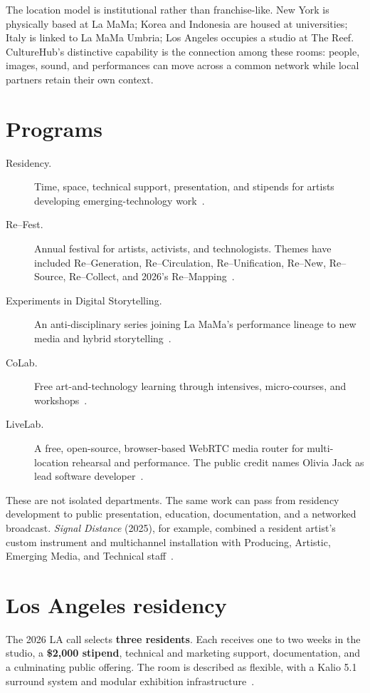 \documentclass[10pt,letterpaper,twocolumn]{article}
\begin{document}
The location model is institutional rather than franchise-like. New York is physically based at La MaMa; Korea and Indonesia are housed at universities; Italy is linked to La MaMa Umbria; Los Angeles occupies a studio at The Reef. CultureHub's distinctive capability is the connection among these rooms: people, images, sound, and performances can move across a common network while local partners retain their own context.

\section{Programs}

\begin{description}
\item[Residency.] Time, space, technical support, presentation, and stipends for artists developing emerging-technology work~\citep{chresidency}.
\item[Re--Fest.] Annual festival for artists, activists, and technologists. Themes have included Re--Generation, Re--Circulation, Re--Unification, Re--New, Re--Source, Re--Collect, and 2026's Re--Mapping~\citep{chrefest}.
\item[Experiments in Digital Storytelling.] An anti-disciplinary series joining La MaMa's performance lineage to new media and hybrid storytelling~\citep{cheds}.
\item[CoLab.] Free art-and-technology learning through intensives, micro-courses, and workshops~\citep{chcolab}.
\item[LiveLab.] A free, open-source, browser-based WebRTC media router for multi-location rehearsal and performance. The public credit names Olivia Jack as lead software developer~\citep{chlivelab}.
\end{description}

These are not isolated departments. The same work can pass from residency development to public presentation, education, documentation, and a networked broadcast. \emph{Signal Distance} (2025), for example, combined a resident artist's custom instrument and multichannel installation with Producing, Artistic, Emerging Media, and Technical staff~\citep{chsignal}.

\section{Los Angeles residency}

The 2026 LA call selects \textbf{three residents}. Each receives one to two weeks in the studio, a \textbf{\$2,000 stipend}, technical and marketing support, documentation, and a culminating public offering. The room is described as flexible, with a Kalio 5.1 surround system and modular exhibition infrastructure~\citep{chresidency,chla}.
\end{document}
